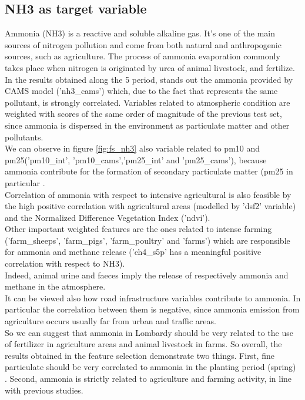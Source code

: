 \subsection{NH3 as target variable}
Ammonia (NH3) is a reactive and soluble alkaline gas. It's one of the main sources of nitrogen pollution and come from both natural and anthropogenic sources, such as agriculture.
The process of ammonia evaporation commonly takes place when nitrogen is originated by urea of animal livestock, and fertilize. \\
In the results obtained along the 5 period, stands out the ammonia provided by CAMS model ('nh3\_cams') which, due to the fact that represents the same pollutant, is strongly correlated. Variables related to atmospheric condition are weighted with scores of the same order of magnitude of the previous test set, since ammonia is dispersed in the environment as particulate matter and other pollutants.\\
We can observe in figure \ref{fig:fs_nh3} also variable related to pm10 and pm25('pm10\_int', 'pm10\_cams','pm25\_int' and 'pm25\_cams'), because ammonia contribute for the formation of secondary particulate matter (pm25 in particular\cite{zhu2015sources} .\\
Correlation of ammonia with respect to intensive agricultural is also feasible by the high positive correlation with agricultural areas (modelled by 'dsf2' variable) and the Normalized Difference Vegetation Index ('ndvi').\\
Other important weighted features are the ones related to intense farming ('farm\_sheeps', 'farm\_pigs', 'farm\_poultry' and 'farms') which are responsible for ammonia and methane release ('ch4\_s5p' has a meaningful positive correlation with respect to NH3).\\
Indeed, animal urine and faeces imply the release of respectively ammonia and methane in the atmosphere\cite{saggar2004review}.\\
It can be viewed also how road infrastructure variables contribute to ammonia. In particular the correlation between them is negative, since ammonia emission from agriculture occurs usually far from urban and traffic areas.\\
So we can suggest that ammonia in Lombardy should be very related to the use of fertilizer in agriculture areas and animal livestock in farms.
\bigbreak
So overall, the results obtained in the feature selection demonstrate two things.  
First, fine particulate should be very correlated to ammonia in the planting period (spring) . Second, ammonia is strictly related to agriculture and farming activity, in line with previous studies.
